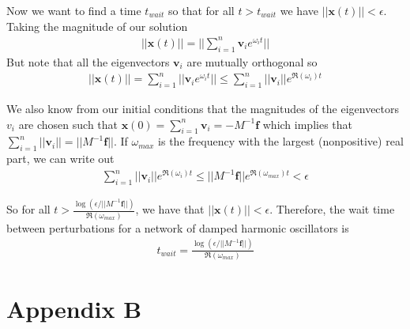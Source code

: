\documentclass[]{article}
\begin{document}
Now we want to find a time $t_{wait}$ so that for all $t > t_{wait}$ we have $||\mathbf{x}(t)|| < \epsilon$. Taking the magnitude of our solution
\begin{align*}
||\mathbf{x}(t)|| = ||\sum_{i=1}^n \mathbf{v}_ie^{\omega_i t}||
\end{align*}
But note that all the eigenvectors $\mathbf{v}_i$ are mutually orthogonal so
\begin{align*}
||\mathbf{x}(t)|| = \sum_{i=1}^n ||\mathbf{v}_ie^{\omega_i t}|| \leq \sum_{i=1}^n ||\mathbf{v}_i|| e^{\Re(\omega_i)t}
\end{align*}

We also know from our initial conditions that the magnitudes of the eigenvectors $v_i$ are chosen such that $\mathbf{x}(0) = \sum_{i=1}^n \mathbf{v}_i = -M^{-1}\mathbf{f}$ which implies that $\sum_{i=1}^n ||\mathbf{v}_i|| = ||M^{-1}\mathbf{f}||$. If $\omega_{max}$ is the frequency with the largest (nonpositive) real part, we can write out
\begin{align*}
\sum_{i=1}^n ||\mathbf{v}_i|| e^{\Re(\omega_i)t} \leq ||M^{-1}\mathbf{f}||e^{\Re(\omega_{max})t} < \epsilon
\end{align*}

So for all $t > \frac{\log(\epsilon / ||M^{-1}\mathbf{f}||)}{\Re(\omega_{max})}$, we have that $||\mathbf{x}(t)|| < \epsilon$. Therefore, the wait time between perturbations for a network of damped harmonic oscillators is
\begin{align*}
t_{wait} = \frac{\log(\epsilon / ||M^{-1}\mathbf{f}||)}{\Re(\omega_{max})}
\end{align*}

\section{Appendix B}


\begin{thebibliography}{9}


\end{thebibliography}
\end{document}
